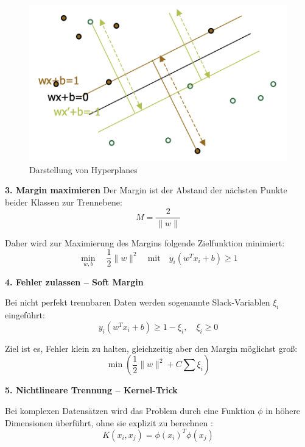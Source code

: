 \begin{figure}[htbp]
    \begin{center}
        \includegraphics[scale=0.5]{static/fig_hyperplanes.png}
        \caption{\label{fig:hyperplanes} Darstellung von Hyperplanes \cite{jakkula2006tutorial}}
    \end{center}
\end{figure}

\textbf{3. Margin maximieren}
Der Margin ist der Abstand der nächsten Punkte beider Klassen zur Trennebene:
\begin{equation}
M = \frac{2}{\|w\|}
\end{equation}

Daher wird zur Maximierung des Margins folgende Zielfunktion minimiert:
\begin{equation}
\min_{w, b} \quad \frac{1}{2} \|w\|^2
\quad \text{mit} \quad y_i(w^T x_i + b) \geq 1
\end{equation}

\textbf{4. Fehler zulassen – Soft Margin}

Bei nicht perfekt trennbaren Daten werden sogenannte Slack-Variablen \( \xi_i \) eingeführt:
\begin{equation}
y_i(w^T x_i + b) \geq 1 - \xi_i, \quad \xi_i \geq 0
\end{equation}

Ziel ist es, Fehler klein zu halten, gleichzeitig aber den Margin möglichst groß:
\begin{equation}
\min \left( \frac{1}{2} \|w\|^2 + C \sum \xi_i \right)
\end{equation}

\textbf{5. Nichtlineare Trennung – Kernel-Trick}

Bei komplexen Datensätzen wird das Problem durch eine Funktion \( \phi \) in höhere Dimensionen überführt, ohne sie explizit zu berechnen \cite{jakkula2006tutorial}:
\begin{equation}
K(x_i, x_j) = \phi(x_i)^T \phi(x_j) 
\end{equation}

